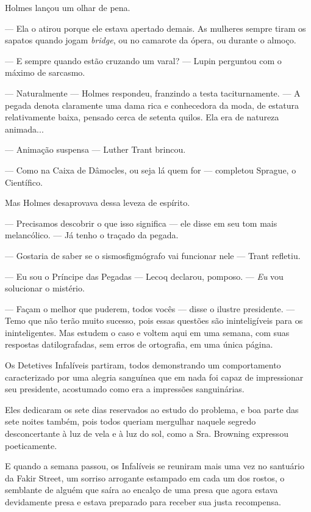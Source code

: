 Holmes lançou um olhar de pena.

--- Ela o atirou porque ele estava apertado demais. As mulheres sempre
tiram os sapatos quando jogam \emph{bridge}, ou no camarote da ópera, ou
durante o almoço.

--- E sempre quando estão cruzando um varal? --- Lupin perguntou com o
máximo de sarcasmo.

--- Naturalmente --- Holmes respondeu, franzindo a testa taciturnamente.
--- A pegada denota claramente uma dama rica e conhecedora da moda, de
estatura relativamente baixa, pensado cerca de setenta quilos. Ela era
de natureza animada...

--- Animação suspensa --- Luther Trant brincou.

--- Como na Caixa de Dâmocles, ou seja lá quem for --- completou
Sprague, o Científico.

Mas Holmes desaprovava dessa leveza de espírito.

--- Precisamos descobrir o que isso significa --- ele disse em seu tom
mais melancólico. --- Já tenho o traçado da pegada.

--- Gostaria de saber se o sismosfigmógrafo vai funcionar nele --- Trant
refletiu.

--- Eu sou o Príncipe das Pegadas --- Lecoq declarou, pomposo. ---
\emph{Eu} vou solucionar o mistério.

--- Façam o melhor que puderem, todos vocês --- disse o ilustre
presidente. --- Temo que não terão muito sucesso, pois essas questões
são ininteligíveis para os ininteligentes. Mas estudem o caso e voltem
aqui em uma semana, com suas respostas datilografadas, sem erros de
ortografia, em uma única página.

Os Detetives Infalíveis partiram, todos demonstrando um comportamento
caracterizado por uma alegria sanguínea que em nada foi capaz de
impressionar seu presidente, acostumado como era a impressões
sanguinárias.

Eles dedicaram os sete dias reservados ao estudo do problema, e boa
parte das sete noites também, pois todos queriam mergulhar naquele
segredo desconcertante à luz de vela e à luz do sol, como a Sra.
Browning expressou poeticamente.

E quando a semana passou, os Infalíveis se reuniram mais uma vez no
santuário da Fakir Street, um sorriso arrogante estampado em cada um dos
rostos, o semblante de alguém que saíra ao encalço de uma presa que
agora estava devidamente presa e estava preparado para receber sua justa
recompensa.

